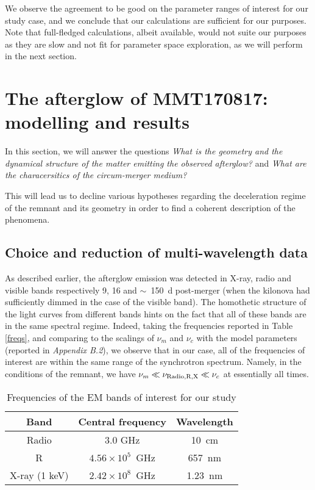 We observe the agreement to be good on the parameter ranges of interest for our study case, and we conclude that our calculations are sufficient for our purposes. Note that full-fledged calculations, albeit available, would not suite our purposes as they are slow and not fit for parameter space exploration, as we will perform in the next section.

\section{The afterglow of MMT170817: modelling and results}

In this section, we will answer the questions \textit{What is the geometry and the dynamical structure of the matter emitting the observed afterglow?} and \textit{What are the characersitics of the circum-merger medium?}

This will lead us to decline various hypotheses regarding the deceleration regime of the remnant and its geometry in order to find a coherent description of the phenomena.

\subsection{Choice and reduction of multi-wavelength data}
As described earlier, the afterglow emission was detected in X-ray, radio and visible bands respectively 9, 16 and $\sim$~150~d post-merger (when the kilonova had sufficiently dimmed in the case of the visible band). The homothetic structure of the light curves from different bands hints on the fact that all of these bands are in the same spectral regime. Indeed, taking the frequencies reported in Table \ref{freqs}, and comparing to the scalings of $\nu_m$ and $\nu_c$ with the model parameters (reported in \textit{Appendix B.2}), we observe that in our case, all of the frequencies of interest are within the same range of the synchrotron spectrum. Namely, in the conditions of the remnant, we have $\nu_m \ll \nu_{\rm{Radio, R, X}} \ll \nu_c$ at essentially all times.

\begin{table}
\begin{center}
\begin{tabular}{c|c|c}
\bf{Band} & \bf{Central frequency} & \bf{Wavelength}\\
\hline
Radio & 3.0 GHz & 10~cm\\
R & $4.56\times 10^5$~GHz & 657~nm \\
X-ray (1 keV) & $2.42\times 10^8$~GHz & 1.23~nm \\
\end{tabular}
\caption{Frequencies of the EM bands of interest for our study}
\label{freq}
\end{center}
\end{table}

